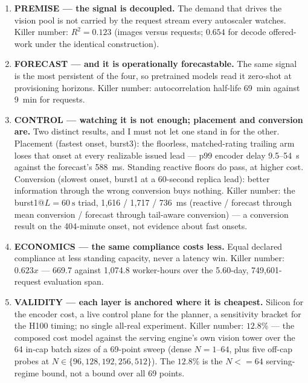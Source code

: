 \documentclass[11pt,a4paper]{article}
\def\times{x}\def\rho{rho}\def\approx{~}\def\leq{<=}\def\geq{>=}%
\def\emph#1{#1}\def\texttt#1{#1}%
\begin{document}
\begin{enumerate}
  \item \textbf{PREMISE --- the signal is decoupled.} The demand that drives
  the vision pool is not carried by the request stream every autoscaler
  watches. \emph{Killer number:} $R^2 = \num{0.123}$ (images versus requests;
  $0.654$ for decode offered-work under the identical construction).

  \item \textbf{FORECAST --- and it is operationally forecastable.} The same
  signal is the most persistent of the four, so pretrained models read it
  zero-shot at provisioning horizons. \emph{Killer number:} autocorrelation
  half-life \SI{69}{\minute} against \SI{9}{\minute} for requests.

  \item \textbf{CONTROL --- watching it is not enough; placement and
  conversion are.} Two distinct results, and I must not let one stand in for
  the other. \emph{Placement} (fastest onset, burst3): the \emph{floorless,
  matched-rating} trailing arm loses that onset at every realizable issued
  lead --- p99 encoder delay 9.5--\SI{54}{\second} against the forecast's
  \SI{588}{\milli\second}. Standing reactive floors do pass, at higher cost.
  \emph{Conversion} (slowest onset, burst1 at a 60-second replica lead):
  better information through the wrong conversion buys nothing.
  \emph{Killer number:} the burst1@$L{=}\SI{60}{\second}$ triad,
  1{,}616 / 1{,}717 / \SI{736}{\milli\second} (reactive / forecast through
  mean conversion / forecast through tail-aware conversion) --- a
  \emph{conversion} result on the 404-minute onset, not evidence about fast
  onsets.

  \item \textbf{ECONOMICS --- the same compliance costs less.}
  Equal declared compliance at less standing capacity, never a latency win.
  \emph{Killer number:} $0.623\times$ --- 669.7 against 1{,}074.8
  worker-hours over the 5.60-day, 749{,}601-request evaluation span.

  \item \textbf{VALIDITY --- each layer is anchored where it is cheapest.}
  Silicon for the encoder cost, a live control plane for the planner, a
  sensitivity bracket for the H100 timing; no single all-real experiment.
  \emph{Killer number:} $12.8\%$ --- the composed cost model against the
  serving engine's own vision tower over the 64 in-cap batch sizes of a
  69-point sweep (dense $N{=}1$--$64$, plus five off-cap probes at
  $N\in\{96,128,192,256,512\}$). The $12.8\%$ is the $N \leq 64$
  serving-regime bound, not a bound over all 69 points.
\end{enumerate}
\end{document}
